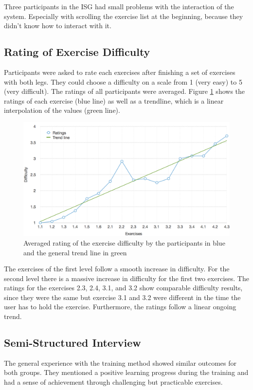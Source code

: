 Three participants in the ISG had small problems with the interaction of the system.
Especially with scrolling the exercise list at the beginning, because they didn't know how to interact with it.

\subsection{Rating of Exercise Difficulty}
Participants were asked to rate each exercises after finishing a set of exercises with both legs.
They could choose a difficulty on a scale from 1 (very easy) to 5 (very difficult).
The ratings of all participants were averaged.
Figure \ref{fig:6_4_exerciseDifficulty} shows the ratings of each exercise (blue line) as well as a trendline, which is a linear interpolation of the values (green line).

\begin{figure}[htb]
	\centering
	\begin{minipage}[t]{0.92\linewidth}
		\centering
		\includegraphics[width=1\linewidth]{Pictures/6_4_DIA_ExerciseDifficulty1}
		\caption{Averaged rating of the exercise difficulty by the participants in blue and the general trend line in green}
		\label{fig:6_4_exerciseDifficulty}
	\end{minipage}
\end{figure}

The exercises of the first level follow a smooth increase in difficulty.
For the second level there is a massive increase in difficulty for the first two exercises.
The ratings for the exercises 2.3, 2.4, 3.1, and 3.2 show comparable difficulty results, since they were the same but exercise 3.1 and 3.2 were different in the time the user has to hold the exercise.
Furthermore, the ratings follow a linear ongoing trend.

\subsection{Semi-Structured Interview}
The general experience with the training method showed similar outcomes for both groups. 
They mentioned a positive learning progress during the training and had a sense of achievement through challenging but practicable exercises.

